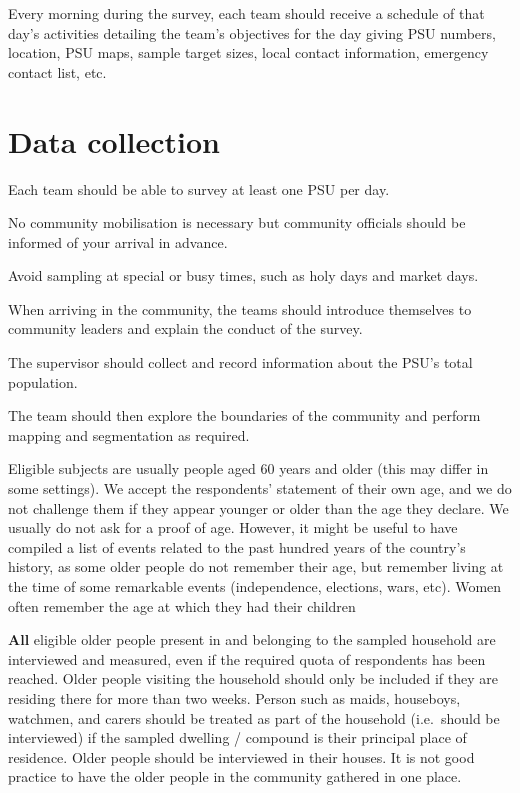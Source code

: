 \documentclass[12pt,a4paper]{book}
\theoremstyle{definition}
\theoremstyle{definition}
\theoremstyle{definition}
\theoremstyle{remark}
\begin{document}
Every morning during the survey, each team should receive a schedule of
that day's activities detailing the team's objectives for the day giving
PSU numbers, location, PSU maps, sample target sizes, local contact
information, emergency contact list, etc.

\hypertarget{data-collection}{%
\section{Data collection}\label{data-collection}}

Each team should be able to survey at least one PSU per day.

No community mobilisation is necessary but community officials should be
informed of your arrival in advance.

Avoid sampling at special or busy times, such as holy days and market
days.

When arriving in the community, the teams should introduce themselves to
community leaders and explain the conduct of the survey.

The supervisor should collect and record information about the PSU's
total population.

The team should then explore the boundaries of the community and perform
mapping and segmentation as required.

Eligible subjects are usually people aged 60 years and older (this may
differ in some settings). We accept the respondents' statement of their
own age, and we do not challenge them if they appear younger or older
than the age they declare. We usually do not ask for a proof of age.
However, it might be useful to have compiled a list of events related to
the past hundred years of the country's history, as some older people do
not remember their age, but remember living at the time of some
remarkable events (independence, elections, wars, etc). Women often
remember the age at which they had their children

\textbf{All} eligible older people present in and belonging to the
sampled household are interviewed and measured, even if the required
quota of respondents has been reached. Older people visiting the
household should only be included if they are residing there for more
than two weeks. Person such as maids, houseboys, watchmen, and carers
should be treated as part of the household (i.e.~should be interviewed)
if the sampled dwelling / compound is their principal place of
residence. Older people should be interviewed in their houses. It is not
good practice to have the older people in the community gathered in one
place.
\end{document}
